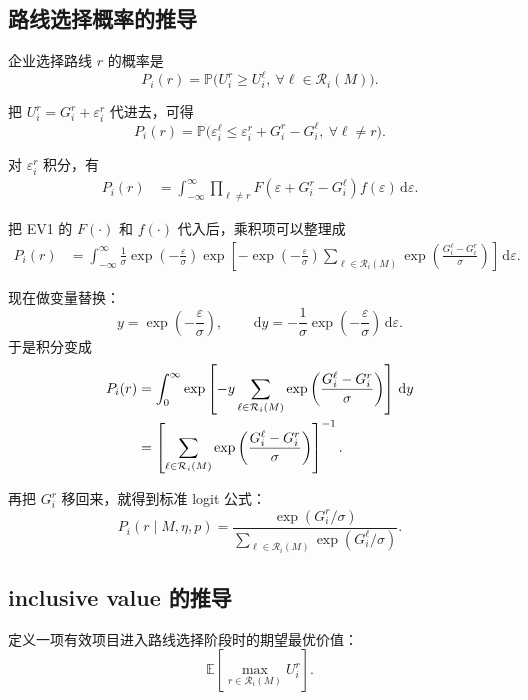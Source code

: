 \documentclass[12pt,UTF8]{ctexart}
\newcommand{\E}{\mathbb{E}}
\newcommand{\Prb}{\mathbb{P}}
\newcommand{\dd}{\,\mathrm{d}}
\newcommand{\Rset}{\mathcal{R}}
\theoremstyle{plain}
\theoremstyle{remark}
\begin{document}
\subsection{路线选择概率的推导}

企业选择路线 $r$ 的概率是
\[
P_i(r)=\Prb\bigl(U_i^r\ge U_i^\ell,\ \forall \ell\in\Rset_i(M)\bigr).
\]

把 $U_i^r=G_i^r+\varepsilon_i^r$ 代进去，可得
\[
P_i(r)
=
\Prb\bigl(
\varepsilon_i^\ell
\le
\varepsilon_i^r + G_i^r-G_i^\ell,\ \forall \ell\neq r
\bigr).
\]

对 $\varepsilon_i^r$ 积分，有
\begin{align}
P_i(r)
&=
\int_{-\infty}^{\infty}
\prod_{\ell\neq r}
F\!\left(\varepsilon + G_i^r-G_i^\ell\right)
f(\varepsilon)\dd \varepsilon.
\label{eq:logit_step1}
\end{align}

把 EV1 的 $F(\cdot)$ 和 $f(\cdot)$ 代入后，乘积项可以整理成
\begin{align}
P_i(r)
&=
\int_{-\infty}^{\infty}
\frac{1}{\sigma}
\exp\left(-\frac{\varepsilon}{\sigma}\right)
\exp\left[
-\exp\left(-\frac{\varepsilon}{\sigma}\right)
\sum_{\ell\in\Rset_i(M)}
\exp\left(\frac{G_i^\ell-G_i^r}{\sigma}\right)
\right]
\dd \varepsilon.
\label{eq:logit_step2}
\end{align}

现在做变量替换：
\[
y=\exp\left(-\frac{\varepsilon}{\sigma}\right),\qquad
\dd y = -\frac{1}{\sigma}\exp\left(-\frac{\varepsilon}{\sigma}\right)\dd\varepsilon.
\]
于是积分变成
\begin{align}
P_i(r)
&=
\int_{0}^{\infty}
\exp\left[
-y
\sum_{\ell\in\Rset_i(M)}
\exp\left(\frac{G_i^\ell-G_i^r}{\sigma}\right)
\right]
\dd y \notag\\
&=
\left[
\sum_{\ell\in\Rset_i(M)}
\exp\left(\frac{G_i^\ell-G_i^r}{\sigma}\right)
\right]^{-1}.
\label{eq:logit_step3}
\end{align}

再把 $G_i^r$ 移回来，就得到标准 logit 公式：
\begin{equation}
P_i(r\mid M,\eta,p)
=
\frac{\exp(G_i^r/\sigma)}
{\sum_{\ell\in\Rset_i(M)}\exp(G_i^\ell/\sigma)}.
\label{eq:logit_prob}
\end{equation}

\subsection{inclusive value 的推导}

定义一项有效项目进入路线选择阶段时的期望最优价值：
\[
\E\left[\max_{r\in\Rset_i(M)}U_i^r\right].
\]
\end{document}
